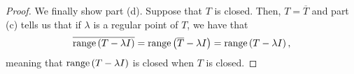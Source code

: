 \begin{proof}
  \medskip

  We finally show part (d). Suppose that $T$ is closed. Then, $T = \overline{T}$ and part (c) tells us that if $\lambda$ is a regular point of $T$, we have that
  \begin{equation*}
    \overline{\operatorname{range}\left(T - \lambda I\right)}
    =
    \operatorname{range}\left(\overline{T} - \lambda I\right)
    =
    \operatorname{range}\left(T - \lambda I\right),
  \end{equation*}
  meaning that $\operatorname{range}\left(T - \lambda I\right)$ is closed when $T$ is closed.
\end{proof}
